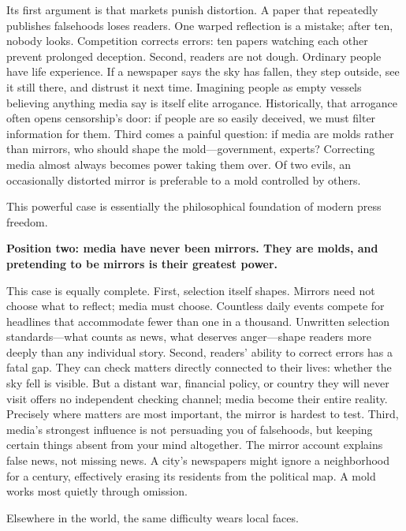Its first argument is that markets punish distortion. A paper that repeatedly publishes falsehoods loses readers. One warped reflection is a mistake; after ten, nobody looks. Competition corrects errors: ten papers watching each other prevent prolonged deception. Second, readers are not dough. Ordinary people have life experience. If a newspaper says the sky has fallen, they step outside, see it still there, and distrust it next time. Imagining people as empty vessels believing anything media say is itself elite arrogance. Historically, that arrogance often opens censorship's door: if people are so easily deceived, we must filter information for them. Third comes a painful question: if media are molds rather than mirrors, who should shape the mold---government, experts? Correcting media almost always becomes power taking them over. Of two evils, an occasionally distorted mirror is preferable to a mold controlled by others.

This powerful case is essentially the philosophical foundation of modern press freedom.

\textbf{Position two: media have never been mirrors. They are molds, and pretending to be mirrors is their greatest power.}

This case is equally complete. First, selection itself shapes. Mirrors need not choose what to reflect; media must choose. Countless daily events compete for headlines that accommodate fewer than one in a thousand. Unwritten selection standards---what counts as news, what deserves anger---shape readers more deeply than any individual story. Second, readers' ability to correct errors has a fatal gap. They can check matters directly connected to their lives: whether the sky fell is visible. But a distant war, financial policy, or country they will never visit offers no independent checking channel; media become their entire reality. Precisely where matters are most important, the mirror is hardest to test. Third, media's strongest influence is not persuading you of falsehoods, but keeping certain things absent from your mind altogether. The mirror account explains false news, not missing news. A city's newspapers might ignore a neighborhood for a century, effectively erasing its residents from the political map. A mold works most quietly through omission.

Elsewhere in the world, the same difficulty wears local faces.

